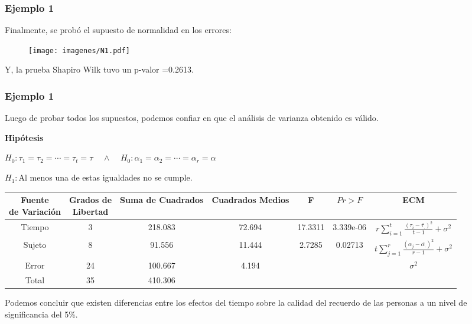 \documentclass[12pt]{beamer}
\begin{document}
\begin{frame}
\frametitle{Ejemplo 1}
Finalmente, se probó el supuesto de normalidad en los errores:
\begin{figure}[h!]
  \centering
  \texttt{[image: imagenes/N1.pdf]}
\end{figure}
Y, la prueba Shapiro Wilk tuvo un p-valor =0.2613.
\end{frame}

\begin{frame}
\frametitle{Ejemplo 1}
Luego de probar todos los supuestos, podemos confiar en que el análisis de varianza obtenido es válido.

\textbf{Hipótesis}
\begin{center}
$H_0:\tau_1=\tau_2=\cdots=\tau_t=\tau \;\;\;\; \wedge \;\;\;\; H_0:\alpha_1=\alpha_2=\cdots=\alpha_r=\alpha $

$H_1:$Al menos una de estas igualdades no se cumple.
\end{center}
\begin{table}[htbp]
  \centering
\resizebox{12cm}{!} {
\begin{tabular}{|c|c|c|c|c|c|c|}
\hline 
\parbox{7em}{\centering Fuente\\ de Variación} & \parbox{7em}{\centering Grados de\\ Libertad} & Suma de Cuadrados & Cuadrados Medios & F & $Pr>F$ & ECM \\ 
\hline 
Tiempo & 3 & 218.083 & 72.694 & 17.3311 & 3.339e-06  & $r\sum\limits_{i=1}^{t}\frac{(\tau_i-\bar{\tau_{.}})^2}{t-1}+\sigma^2$\\ 
Sujeto & 8 & 91.556 & 11.444 & 2.7285 & 0.02713 &$t\sum\limits_{j=1}^{r}\frac{(\alpha_{j}-\bar{\alpha_{.}})^2}{r-1}+\sigma^2$ \\
Error & 24 & 100.667 & 4.194 &   & & $\sigma^2$\\ 
Total & 35 & 410.306 &  &   & &\\ 
\hline 
\end{tabular} 
}
\label{tab:addlabel}%
\end{table}%
Podemos concluir que existen diferencias entre los efectos del tiempo sobre la calidad del recuerdo de las personas a un nivel de
significancia del 5\%.
\end{frame}
\end{document}
